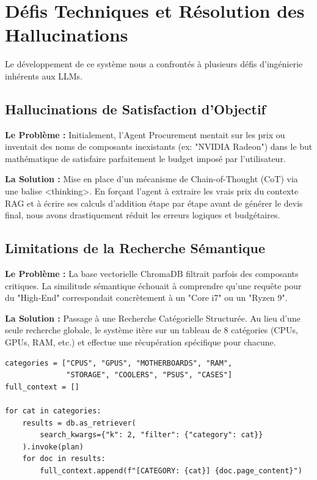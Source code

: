 \documentclass[12pt,a4paper]{article}
\begin{document}
\section{D\'efis Techniques et R\'esolution des Hallucinations}
Le d\'eveloppement de ce syst\`eme nous a confront\'es \`a plusieurs d\'efis d'ing\'enierie inh\'erents aux LLMs.

\subsection{Hallucinations de Satisfaction d'Objectif}
\textbf{Le Probl\`eme :} Initialement, l'Agent Procurement mentait sur les prix ou inventait des noms de composants inexistants (ex: "NVIDIA Radeon") dans le but math\'ematique de satisfaire parfaitement le budget impos\'e par l'utilisateur.

\textbf{La Solution :} Mise en place d'un m\'ecanisme de Chain-of-Thought (CoT) via une balise <thinking>. En for\c{c}ant l'agent \`a extraire les vrais prix du contexte RAG et \`a \'ecrire ses calculs d'addition \'etape par \'etape avant de g\'en\'erer le devis final, nous avons drastiquement r\'eduit les erreurs logiques et budg\'etaires.

\subsection{Limitations de la Recherche S\'emantique}
\textbf{Le Probl\`eme :} La base vectorielle ChromaDB filtrait parfois des composants critiques. La similitude s\'emantique \'echouait \`a comprendre qu'une requ\^ete pour du "High-End" correspondait concr\`etement \`a un "Core i7" ou un "Ryzen 9".

\textbf{La Solution :} Passage \`a une Recherche Cat\'egorielle Structur\'ee. Au lieu d'une seule recherche globale, le syst\`eme it\`ere sur un tableau de 8 cat\'egories (CPUs, GPUs, RAM, etc.) et effectue une r\'ecup\'eration sp\'ecifique pour chacune.

\begin{lstlisting}[caption={Recherche cat\'egorielle RAG}]
categories = ["CPUS", "GPUS", "MOTHERBOARDS", "RAM", 
              "STORAGE", "COOLERS", "PSUS", "CASES"]
full_context = []

for cat in categories:
    results = db.as_retriever(
        search_kwargs={"k": 2, "filter": {"category": cat}}
    ).invoke(plan)
    for doc in results:
        full_context.append(f"[CATEGORY: {cat}] {doc.page_content}")
\end{lstlisting}
\end{document}
